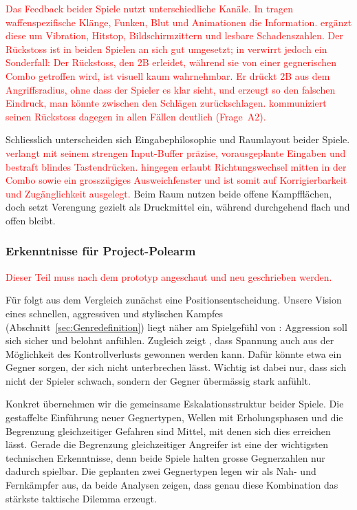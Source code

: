 \documentclass[../Main.tex]{subfiles}
\begin{document}
\textcolor{red}{Das Feedback beider Spiele nutzt unterschiedliche Kanäle. In  tragen waffenspezifische Klänge, Funken, Blut und Animationen die Information.  ergänzt diese um Vibration, Hitstop, Bildschirmzittern und lesbare Schadenszahlen. Der Rückstoss ist in beiden Spielen an sich gut umgesetzt; in  verwirrt jedoch ein Sonderfall: Der Rückstoss, den 2B erleidet, während sie von einer gegnerischen Combo getroffen wird, ist visuell kaum wahrnehmbar. Er drückt 2B aus dem Angriffsradius, ohne dass der Spieler es klar sieht, und erzeugt so den falschen Eindruck, man könnte zwischen den Schlägen zurückschlagen.  kommuniziert seinen Rückstoss dagegen in allen Fällen deutlich (Frage~A2).}

Schliesslich unterscheiden sich Eingabephilosophie und Raumlayout beider Spiele. \textcolor{red}{ verlangt mit seinem strengen Input-Buffer präzise, vorausgeplante Eingaben und bestraft blindes Tastendrücken.  hingegen erlaubt Richtungswechsel mitten in der Combo sowie ein grosszügiges Ausweichfenster und ist somit auf Korrigierbarkeit und Zugänglichkeit ausgelegt.} Beim Raum nutzen beide offene Kampfflächen, doch  setzt Verengung gezielt als Druckmittel ein, während  durchgehend flach und offen bleibt.

\subsubsection{Erkenntnisse für Project-Polearm}

\textcolor{red}{Dieser Teil muss nach dem prototyp angeschaut und neu geschrieben werden.}

Für  folgt aus dem Vergleich zunächst eine Positionsentscheidung. Unsere Vision eines schnellen, aggressiven und stylischen Kampfes (Abschnitt~\ref{sec:Genredefinition}) liegt näher am Spielgefühl von : Aggression soll sich sicher und belohnt anfühlen. Zugleich zeigt , dass Spannung auch aus der Möglichkeit des Kontrollverlusts gewonnen werden kann. Dafür könnte etwa ein Gegner sorgen, der sich nicht unterbrechen lässt. Wichtig ist dabei nur, dass sich nicht der Spieler schwach, sondern der Gegner übermässig stark anfühlt.

Konkret übernehmen wir die gemeinsame Eskalationsstruktur beider Spiele. Die gestaffelte Einführung neuer Gegnertypen, Wellen mit Erholungsphasen und die Begrenzung gleichzeitiger Gefahren sind Mittel, mit denen sich dies erreichen lässt. Gerade die Begrenzung gleichzeitiger Angreifer ist eine der wichtigsten technischen Erkenntnisse, denn beide Spiele halten grosse Gegnerzahlen nur dadurch spielbar. Die geplanten zwei Gegnertypen legen wir als Nah- und Fernkämpfer aus, da beide Analysen zeigen, dass genau diese Kombination das stärkste taktische Dilemma erzeugt.
\end{document}
